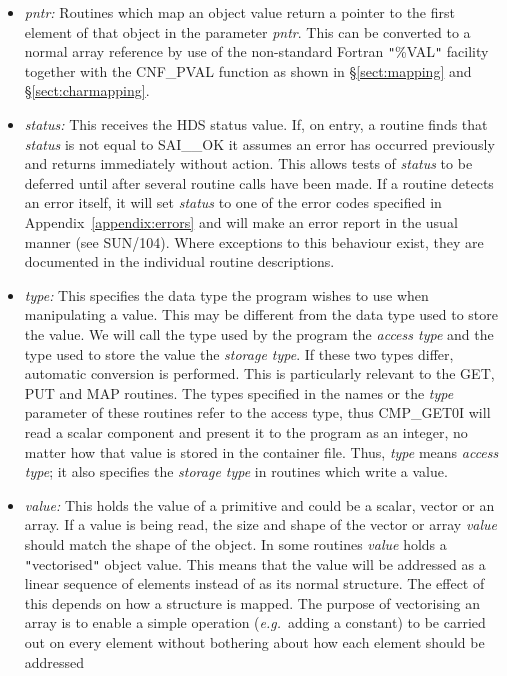 \documentclass[11pt]{article}
\newcommand{\htmlref}[2]{#1}
\newcommand{\xref}[3]{#1}
\newcommand{\qt}[1]{``#1''}
\newcommand{\st}[1]{{\em{#1}}}
\renewcommand{\qt}[1]{{\tt{"}}#1{\tt{"}}}
\begin{document}
\begin{itemize}
\item \st{pntr:}
Routines which map an object value return a pointer to the first
element of that object in the parameter \st{pntr}. This can be
converted to a normal array reference by use of the non-standard
Fortran \qt{\%VAL} facility together with the
\xref{CNF\_PVAL}{sun209}{CNF_PVAL} function as shown in
\S\ref{sect:mapping} and \S\ref{sect:charmapping}.

\item \st{status:}
This receives the HDS status value. If, on entry, a routine finds that
\st{status} is not equal to SAI\_\_OK it assumes an error has
occurred previously and returns immediately without action. This
allows tests of \st{status} to be deferred until after several
routine calls have been made. If a routine detects an error itself, it
will set \st{status} to one of the error codes specified in
Appendix~\ref{appendix:errors} and will make an error report in the
usual manner (see \xref{SUN/104}{sun104}{}). Where exceptions to this
behaviour exist, they are documented in the individual routine
descriptions.

\item \htmlref{\st{type:}}{sect:type}
This specifies the data type the program wishes to use when
manipulating a value. This may be different from the data type used to
store the value. We will call the type used by the program the
\st{access type} and the type used to store the value the \st{storage
type}. If these two types differ, automatic conversion is
performed. This is particularly relevant to the GET, PUT and MAP
routines. The types specified in the names or the \st{type} parameter
of these routines refer to the access type, thus
\htmlref{CMP\_GET0I}{CMP_GET0x} will read a scalar component and
present it to the program as an integer, no matter how that value is
stored in the container file. Thus, \st{type} means \st{access type};
it also specifies the \st{storage type} in routines which write a
value.

\item \st{value:}
This holds the value of a primitive and could be a scalar, vector or
an array.  If a value is being read, the size and shape of the vector
or array \st{value} should match the shape of the object. In some
routines \st{value} holds a \qt{vectorised} object value. This means
that the value will be addressed as a linear sequence of elements
instead of as its normal structure. The effect of this depends on how
a structure is mapped. The purpose of vectorising an array is to
enable a simple operation (\st{e.g.}\ adding a constant) to be carried
out on every element without bothering about how each element should
be addressed

\end{itemize}
\end{document}
